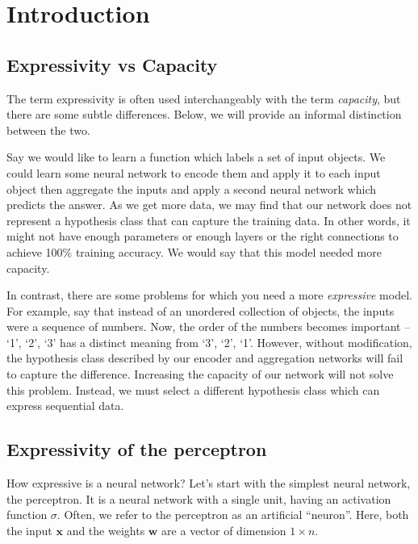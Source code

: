 \documentclass{article}
\begin{document}
\section{Introduction}



\subsection{Expressivity vs Capacity}
The term expressivity is often used interchangeably with the term \textit{capacity}, but there are some subtle differences. Below, we will provide an informal distinction between the two.

Say we would like to learn a function which labels a set of input objects. We could learn some neural network to encode them and apply it to each input object then aggregate the inputs and apply a second neural network which predicts the answer. As we get more data, we may find that our network does not represent a hypothesis class that can capture the training data. In other words, it might not have enough parameters or enough layers or the right connections to achieve 100\% training accuracy. We would say that this model needed more capacity.

In contrast, there are some problems for which you need a more \textit{expressive} model. For example, say that instead of an unordered collection of objects, the inputs were a sequence of numbers. Now, the order of the numbers becomes important -- `1', `2', `3' has a distinct meaning from `3', `2', `1'. However, without modification, the hypothesis class described by our encoder and aggregation networks will fail to capture the difference. Increasing the capacity of our network will not solve this problem. Instead, we must select a different hypothesis class which can express sequential data.


\subsection{Expressivity of the perceptron}
How expressive is a neural network? Let's start with the simplest neural network, the perceptron. It is a neural network with a single unit, having an activation function $\sigma$. Often, we refer to the perceptron as an artificial ``neuron''. Here, both the input $\textbf{x}$ and the weights $\textbf{w}$ are a vector of dimension $1 \times n$.
\end{document}
